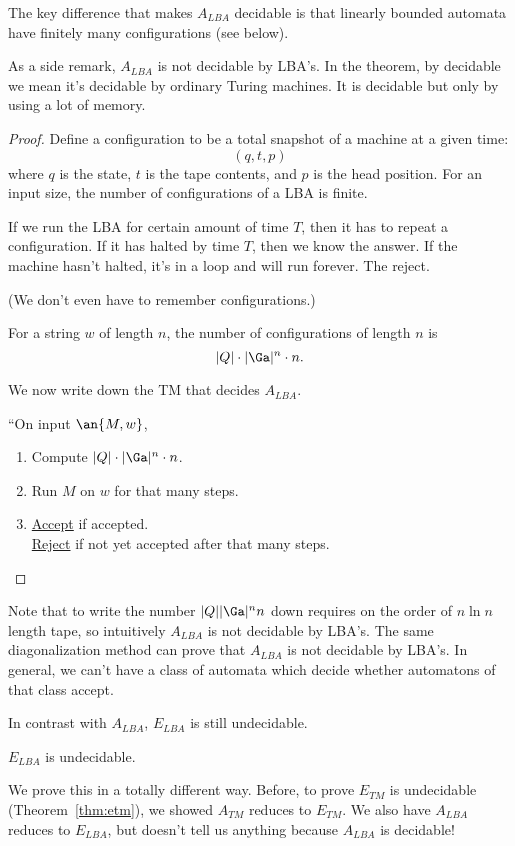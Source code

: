 The key difference that makes $A_{LBA}$ decidable is that linearly bounded automata have finitely many configurations (see below).

As a side remark, $A_{LBA}$ is not decidable by LBA's. In the theorem, by decidable we mean it's decidable by ordinary Turing machines. It is decidable but only by using a lot of memory.
\begin{proof}
Define a configuration to be a total snapshot of a machine at a given time:
\[
(q,t,p)
\]
where $q$ is the state, $t$ is the tape contents, and $p$ is the head position.
 For an input size, the number of configurations of a LBA %
is finite.

If we run the LBA for certain amount of time $T$, then it has to repeat a configuration.  If it has halted by time $T$, then we know the answer. If the machine hasn't halted, it's in a loop and will run forever. The reject.

(We don't even have to remember configurations.)


For a string $w$ of length $n$, the number of configurations of length $n$ is 
\[
|Q|\cdot |\Ga|^{n}\cdot n.
\]

We now write down the TM that decides $A_{LBA}$.

``On input $\an{M,w}$,
\begin{enumerate}
\item
Compute $|Q|\cdot |\Ga|^n \cdot n$.
\item
Run $M$ on $w$ for that many steps.
\item
\ul{Accept} if accepted.\\
\ul{Reject} if not yet accepted after that many steps.
\end{enumerate}
\end{proof}
Note that to write the number $|Q||\Ga|^nn$ down requires on the order of $n\ln n$ length tape, so intuitively $A_{LBA}$ is not  decidable by LBA's. The same diagonalization method can prove that $A_{LBA}$ is not decidable by LBA's. In general, we can't have a class of automata which decide whether automatons of that class accept.

In contrast with $A_{LBA}$, $E_{LBA}$ is still undecidable.
\begin{thm}
$E_{LBA}$ is undecidable.
\end{thm}
We prove this in a totally different way. Before, to prove $E_{TM}$ is undecidable (Theorem~\ref{thm:etm}), we showed $A_{TM}$ reduces to $E_{TM}$. We also have $A_{LBA}$ reduces to $E_{LBA}$, but doesn't tell us anything because $A_{LBA}$ is decidable!

